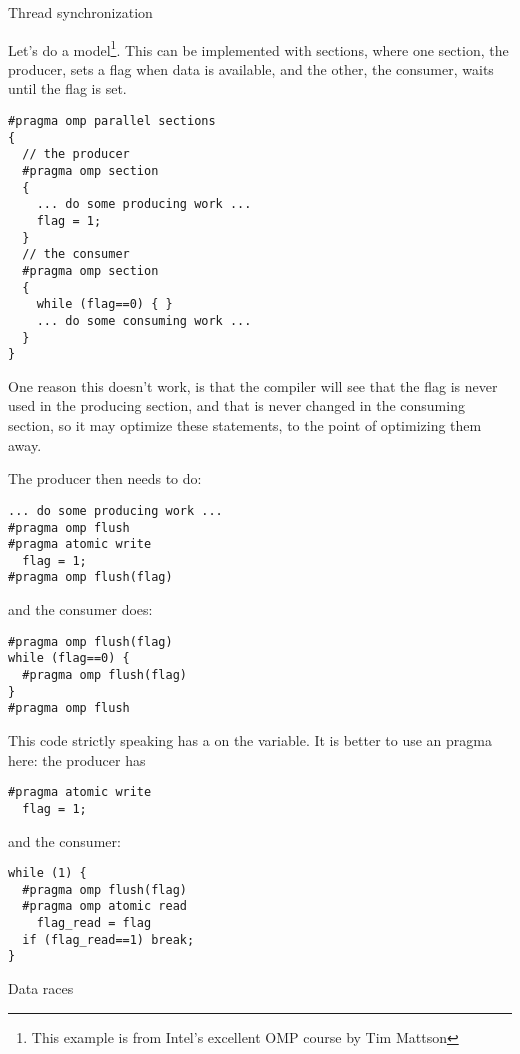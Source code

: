 
 {Thread synchronization}

Let's do a  model\footnote{This example
  is from Intel's excellent OMP course by Tim Mattson}.  This can be
implemented with sections, where one section, the producer, sets a
flag when data is available, and the other, the consumer, waits until
the flag is set.
\begin{verbatim}
#pragma omp parallel sections
{
  // the producer
  #pragma omp section
  {
    ... do some producing work ...
    flag = 1;
  }
  // the consumer
  #pragma omp section
  {
    while (flag==0) { }
    ... do some consuming work ...
  }
}
\end{verbatim}
One reason this doesn't work, is that the compiler will see that the flag is never used
in the producing section, and that is never changed in the consuming section, so
it may optimize these statements, to the point of optimizing them away.

The producer then needs to do:
\begin{verbatim}
... do some producing work ...
#pragma omp flush
#pragma atomic write
  flag = 1;
#pragma omp flush(flag)
\end{verbatim}
and the consumer does:
\begin{verbatim}
#pragma omp flush(flag)
while (flag==0) {
  #pragma omp flush(flag)
}
#pragma omp flush
\end{verbatim}
This code strictly speaking has a  on the  variable.
It is better to use an  pragma here: the producer has
\begin{verbatim}
#pragma atomic write
  flag = 1;
\end{verbatim}
and the consumer:
\begin{verbatim}
while (1) {
  #pragma omp flush(flag)
  #pragma omp atomic read
    flag_read = flag
  if (flag_read==1) break;
}
\end{verbatim}

 {Data races}


